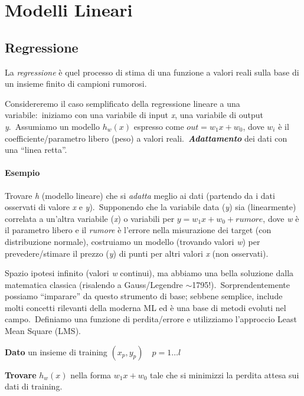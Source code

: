 \chapter{Modelli Lineari}

\section{Regressione}

La \textit{regressione} è quel processo di stima di una funzione a valori reali sulla base di un insieme finito di campioni rumorosi.\

Considereremo il caso semplificato della regressione lineare a una variabile:\ iniziamo con una variabile di input \textit{x}, una variabile di output \textit{y}.\
Assumiamo un modello $h_w(x)$ espresso come $out = w_1 x + w_0$, dove $w_i$ è il coefficiente/parametro libero (peso) a valori reali.\
\textbf{\textit{Adattamento}} dei dati con una ``linea retta''.\

\subsubsection{Esempio}

Trovare \textit{h} (modello lineare) che si \textit{adatta} meglio ai dati (partendo da i dati osservati di valore \textit{x} e \textit{y}).\
Supponendo che la variabile data (\textit{y}) sia (linearmente) correlata a un'altra variabile (\textit{x}) o variabili per $y = w_1 x + w_0 + rumore$, dove \textit{w} è il parametro libero e il \textit{rumore} è l'errore nella misurazione dei target (con distribuzione normale), costruiamo un modello (trovando valori \textit{w}) per prevedere/stimare il prezzo (\textit{y}) di punti per altri valori \textit{x} (non osservati).\

Spazio ipotesi infinito (valori \textit{w} continui), ma abbiamo una bella soluzione dalla matematica classica (risalendo a Gauss/Legendre $\sim$1795!).\
Sorprendentemente possiamo ``imparare'' da questo strumento di base; sebbene semplice, include molti concetti rilevanti della moderna ML ed è una base di metodi evoluti nel campo.\
Definiamo una funzione di perdita/errore e utilizziamo l'approccio Least Mean Square (LMS).

\begin{flushleft}
	\textbf{Dato} un insieme di training $(x_p, y_p)\quad p = 1\dots l$

	\textbf{Trovare} $h_w(x)$ nella forma $w_1x + w_0$ tale che si minimizzi la perdita attesa sui dati di training.

\end{flushleft}

